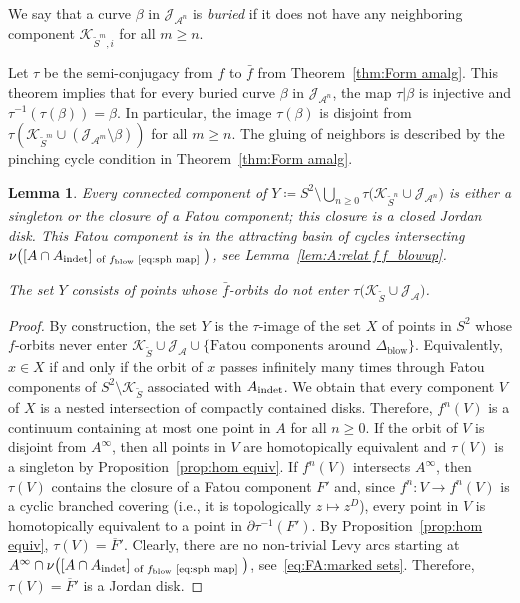 \documentclass{amsart}
\theoremstyle{plain}
\newtheorem{lemma}[theorem]{Lemma}
\theoremstyle{definition}
\theoremstyle{remark}
\renewcommand{\AA}{{\mathcal A}}
\newcommand{\blowup}{{\operatorname{blow}}}
\newcommand{\filled}{{\mathcal K}}
\newcommand{\reminder}[1]{\textsl{$\lhd\rhd$#1$\lhd\rhd$}\marginpar{$\lhd\rhd\lhd\rhd\lhd\rhd$}}%
\newcommand{\hide}[1]{}
\newcommand{\Jul}{{\mathcal J}}
\begin{document}
We say that a curve $\beta$ in $\Jul_{\AA^n}$ is \emph{buried} if it does not have any neighboring component $\filled_{\widetilde S^m ,i}$ for all $m\ge n$. 




Let $\tau$ be the semi-conjugacy from $f$ to $\bar f$ from Theorem~\ref{thm:Form amalg}. This theorem implies that for every buried curve $\beta$ in $\Jul_{\AA^n}$, the map $\tau|\beta$ is injective and $\tau^{-1}(\tau(\beta)) = \beta$. In particular, the image $\tau(\beta)$ is disjoint from $\tau(\filled_{\widetilde S^m}\cup (\Jul_{\AA^m}\setminus \beta))$ for all $m\ge n$. 
The gluing of neighbors is described by the pinching cycle condition in Theorem~\ref{thm:Form amalg}. 

\begin{lemma}
\label{lem:TotDisc} Every connected component of $Y\coloneq \displaystyle S^2\setminus \bigcup_{n\ge 0}  \tau\big(\filled_{\widetilde S^n} \cup \Jul_{\AA^n}\big)$ is either a singleton or the closure of a Fatou component; this closure is a closed Jordan disk. This Fatou component is in the attracting basin of cycles intersecting $\nu \big( [A\cap A_\indet ]_{\text{ of $f_\blowup$ \eqref{eq:sph map} }}\big)$, see Lemma~\ref{lem:A:relat f f_blowup}.

The set $Y$ consists of points whose $\bar f$-orbits do not enter $\tau\big(\filled_{\widetilde S} \cup \Jul_{\AA}\big)$.
\end{lemma}




\begin{proof}
By construction, the set $Y$ is the $\tau$-image of the set $X$ of points in $S^2$ whose $f$-orbits never enter $\filled_{\widetilde S}\cup \Jul_{\AA}\cup \{\text{Fatou components around $\Delta_\blowup$}\}$. Equivalently, $x\in X$ if and only if the orbit of $x$ passes infinitely many times through Fatou components of $S^2\setminus \filled_{\widetilde S}$ associated with $A_{\operatorname{indet}}$. We obtain that every component $V$ of $X$ is a nested intersection of compactly contained disks. Therefore, $f^n(V)$ is a continuum containing at most one point in $A$ for all $n\ge 0$. If the orbit of $V$ is disjoint from $A^\infty$, then all points in $V$ are homotopically equivalent and $\tau(V)$ is a singleton by Proposition~\ref{prop:hom equiv}. If $f^n(V)$ intersects $A^\infty$, then $\tau(V)$ contains the closure of a Fatou component $F'$ and, since $f^n\colon V\to f^n(V)$ is a cyclic branched covering (i.e., it is topologically $z\mapsto z^D$), every point in $V$ is homotopically equivalent to a point in $\partial \tau^{-1}(F')$. By Proposition~\ref{prop:hom equiv}, $\tau(V)=\overline F'$. Clearly, there are no non-trivial Levy arcs starting at $A^\infty \cap \nu \big( [A\cap A_\indet ]_{\text{ of $f_\blowup$ \eqref{eq:sph map} }}\big)$, see~\eqref{eq:FA:marked sets}. Therefore, $\tau(V)=\overline F'$ is a Jordan disk.
\end{proof}
\end{document}

